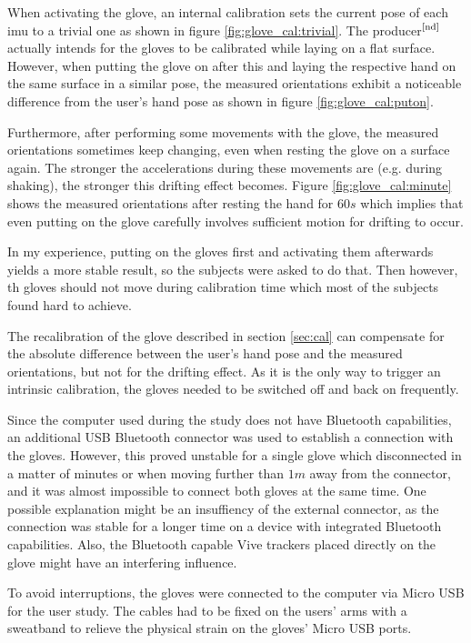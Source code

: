 \documentclass[hyperref, bachelorofscience]{cgvpub}
\newcommand{\newcite}[1]{$ ^{\text{\cite{#1}}} $}
\begin{document}
When activating the glove, an internal calibration sets the current pose of each \acrshort{imu} to a trivial one as shown in figure \ref{fig:glove_cal:trivial}. The producer\newcite{nd} actually intends for the gloves to be calibrated while laying on a flat surface. However, when putting the glove on after this and laying the respective hand on the same surface in a similar pose, the measured orientations exhibit a noticeable difference from the user's hand pose as shown in figure \ref{fig:glove_cal:puton}. 

Furthermore, after performing some movements with the glove, the measured orientations sometimes keep changing, even when resting the glove on a surface again. The stronger the accelerations during these movements are (e.g. during shaking), the stronger this drifting effect becomes. Figure \ref{fig:glove_cal:minute} shows the measured orientations after resting the hand for $ 60s $ which implies that even putting on the glove carefully involves sufficient motion for drifting to occur.

In my experience, putting on the gloves first and activating them afterwards yields a more stable result, so the subjects were asked to do that. Then however, th gloves should not move during calibration time which most of the subjects found hard to achieve.

The recalibration of the glove described in section \ref{sec:cal} can compensate for the absolute difference between the user's hand pose and the measured orientations, but not for the drifting effect. As it is the only way to trigger an intrinsic calibration, the gloves needed to be switched off and back on frequently. 

Since the computer used during the study does not have Bluetooth capabilities, an additional USB Bluetooth connector was used to establish a connection with the gloves. However, this proved unstable for a single glove which disconnected in a matter of minutes or when moving further than $ 1m $ away from the connector, and it was almost impossible to connect both gloves at the same time. One possible explanation might be an insuffiency of the external connector, as the connection was stable for a longer time on a device with integrated Bluetooth capabilities. Also, the Bluetooth capable Vive trackers placed directly on the glove might have an interfering influence.

To avoid interruptions, the gloves were connected to the computer via Micro USB for the user study. The cables had to be fixed on the users' arms with a sweatband to relieve the physical strain on the gloves' Micro USB ports.
\end{document}
